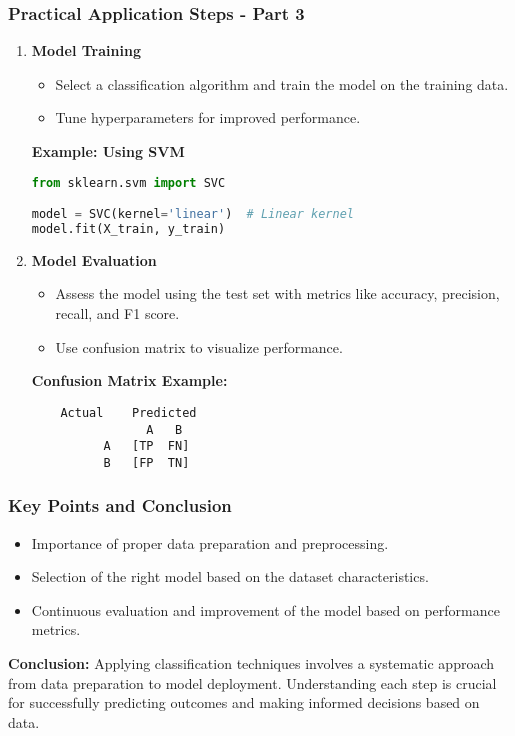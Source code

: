 \documentclass[aspectratio=169]{beamer}
\begin{document}
\begin{frame}[fragile]
    \frametitle{Practical Application Steps - Part 3}
    \begin{enumerate}[resume]
        \item \textbf{Model Training}
        \begin{itemize}
            \item Select a classification algorithm and train the model on the training data.
            \item Tune hyperparameters for improved performance.
        \end{itemize}
        \textbf{Example: Using SVM}
        \begin{lstlisting}[language=Python]
from sklearn.svm import SVC

model = SVC(kernel='linear')  # Linear kernel
model.fit(X_train, y_train)
        \end{lstlisting}

        \item \textbf{Model Evaluation}
        \begin{itemize}
            \item Assess the model using the test set with metrics like accuracy, precision, recall, and F1 score.
            \item Use confusion matrix to visualize performance.
        \end{itemize}
        \textbf{Confusion Matrix Example:}
        \begin{verbatim}
    Actual    Predicted
                A   B
          A   [TP  FN]
          B   [FP  TN]
        \end{verbatim}
    \end{enumerate}
\end{frame}

\begin{frame}
    \frametitle{Key Points and Conclusion}
    \begin{itemize}
        \item Importance of proper data preparation and preprocessing.
        \item Selection of the right model based on the dataset characteristics.
        \item Continuous evaluation and improvement of the model based on performance metrics.
    \end{itemize}
    \textbf{Conclusion:} Applying classification techniques involves a systematic approach from data preparation to model deployment. Understanding each step is crucial for successfully predicting outcomes and making informed decisions based on data.
\end{frame}
\end{document}

